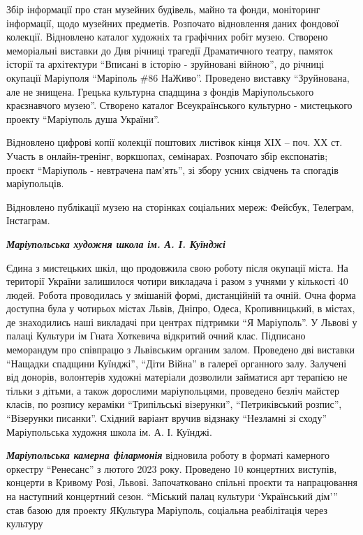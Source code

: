 Збір інформації про стан музейних будівель, майно та фонди, моніторинг
інформації, щодо музейних предметів. Розпочато відновлення даних фондової
колекції. Відновлено каталог художніх  та графічних робіт музею. Створено
меморіальні виставки до Дня річниці трагедії Драматичного театру,  памяток
історії та архітектури \enquote{Вписані в історію - зруйновані війною}, до річниці
окупації Маріуполя \enquote{Маріполь \#86 НаЖиво}. Проведено виставку \enquote{Зруйнована, але
не знищена. Грецька культурна спадщина з фондів Маріупольського краєзнавчого
музею}.  Створено каталог  Всеукраїнського культурно - мистецького проекту
\enquote{Маріуполь душа України}. 

Відновлено цифрові копії колекції поштових листівок кінця ХІХ – поч. ХХ ст.
Участь в онлайн-тренінг, воркшопах, семінарах. Розпочато  збір
експонатів; проєкт \enquote{Маріуполь - невтрачена пам'ять}, зі збору усних свідчень та
спогадів маріупольців.

Відновлено публікації музею на сторінках соціальних мереж: Фейсбук, Телеграм,
Інстаграм.

\emph{\color{blue}\bfseries Маріупольська художня школа ім. А. І. Куїнджі}

Єдина з мистецьких шкіл, що продовжила свою роботу після окупації міста. На
території України залишилося чотири викладача і разом з учнями у кількості 40
людей. Робота  проводилась у змішаній формі, дистанційній та очній. Очна форма
доступна була у чотирьох містах Львів, Дніпро, Одеса, Кропивницький, в містах,
де знаходились наші викладачі при центрах підтримки \enquote{Я Маріуполь}. У Львові у
палаці Культури ім Гната Хоткевича відкритий очний клас. Підписано меморандум
про співпрацю з Львівським органим залом. Проведено дві виставки \enquote{Нащадки
спадщини Куїнджі}, \enquote{Діти Війна} в галереї органного залу. Залучені від донорів,
волонтерів художні матеріали дозволили займатися арт терапією не тільки з
дітьми, а також дорослими маріупольцями, проведено безліч майстер класів, по
розпису кераміки \enquote{Трипільські візерунки}, \enquote{Петриківський розпис}, \enquote{Візерунки
писанки}. Східний варіант вручив відзнаку \enquote{Незламні зі сходу} Маріупольська
художня школа ім. А. І. Куїнджі.

\emph{\color{blue}\bfseries Маріупольська камерна філармонія} відновила роботу в форматі камерного оркестру
\enquote{Ренесанс} з лютого 2023 року. Проведено 10 концертних виступів, концерти в
Кривому Розі, Львові. Започатковано спільні проєкти та напрацювання на
наступний концертний сезон. \enquote{Міський палац культури \enquote{Український дім}} став
базою для проекту ЯКультура Маріуполь, соціальна реабілітація через культуру

